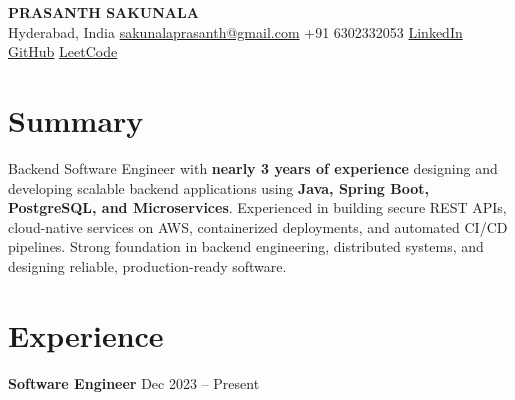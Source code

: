 \documentclass[10pt,a4paper]{article}
\begin{document}
\begin{center}
    {\LARGE \textbf{PRASANTH SAKUNALA}} \\[3pt]
    Hyderabad, India \;\textbar\;
    \href{mailto:sakunalaprasanth@gmail.com}{sakunalaprasanth@gmail.com} \;\textbar\;
    +91 6302332053 \;\textbar\;
    \href{https://linkedin.com/in/prasanth-sakunala-45b98a215}{LinkedIn} \;\textbar\;
    \href{https://github.com/Prasanth-sakunala}{GitHub}
    \;\textbar\;
    \href{https://leetcode.com/u/Prasanth_sakunala/}{LeetCode}
\end{center}

\vspace{2pt}

\section*{Summary}
Backend Software Engineer with \textbf{ nearly 3 years of experience} designing and developing scalable backend applications using \textbf{Java, Spring Boot, PostgreSQL, and Microservices}. Experienced in building secure REST APIs, cloud-native services on AWS, containerized deployments, and automated CI/CD pipelines. Strong foundation in backend engineering, distributed systems, and designing reliable, production-ready software.

\section*{Experience}

\textbf{Software Engineer} \hfill Dec 2023 -- Present
\end{document}
